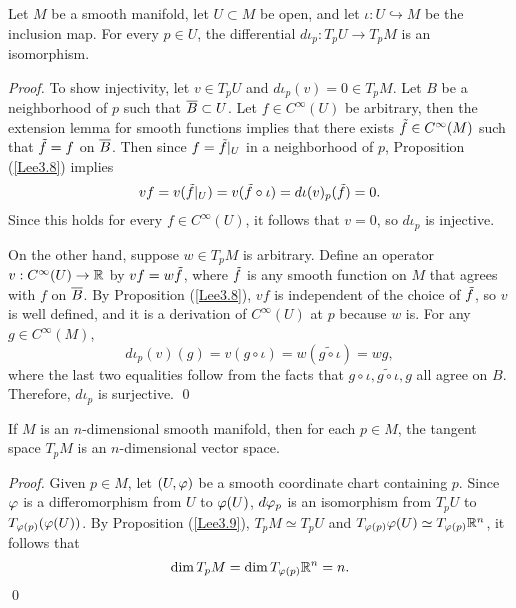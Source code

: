 \begin{proposition}\label{Lee3.9}
    Let $M$ be a smooth manifold, let $U \subset M$ be open, and let $\iota: U \hookrightarrow M$ be the inclusion map. For every $p \in U$, the differential $d\iota_p: T_pU \to T_pM$ is an isomorphism. 
\end{proposition}
\begin{proof}
    To show injectivity, let $v \in T_pU$ and $d\iota_p(v) = 0 \in T_pM$. Let $B$ be a neighborhood of $p$ such that $\overline{B} \subset U$. Let $f \in C^\infty(U)$ be arbitrary, then the extension lemma for smooth functions implies that there exists $\Tilde{f} \in C^\infty(M)$ such that $\Tilde{f} = f$ on $\overline{B}$. Then since $f=\Tilde{f}|_U$ in a neighborhood of $p$, Proposition (\ref{Lee3.8}) implies 
    $$vf=v(\Tilde{f}|_U) = v(\Tilde{f} \circ \iota) = d\iota(v)_p (\Tilde{f}) = 0.$$
    Since this holds for every $f \in C^\infty(U)$, it follows that $v=0$, so $d\iota_p$ is injective. 

    On the other hand, suppose $w \in T_pM$ is arbitrary. Define an operator $v:C^\infty(U) \to \mathbb{R}$ by $vf = w\Tilde{f}$, where $\Tilde{f}$ is any smooth function on $M$ that agrees with $f$ on $\overline{B}$. By Proposition (\ref{Lee3.8}), $vf$ is independent of the choice of $\Tilde{f}$, so $v$ is well defined, and it is a derivation of $C^\infty(U)$ at $p$ because $w$ is. For any $g \in C^\infty(M)$, 
    $$d\iota_p(v)(g) = v(g \circ \iota) = w(\widetilde{g \circ \iota}) = wg, $$
    where the last two equalities follow from the facts that $g \circ \iota, \widetilde{g \circ \iota}, g$ all agree on $B$. Therefore, $d\iota_p$ is surjective. \qed 
\end{proof}
\begin{proposition}
    If $M$ is an $n$-dimensional smooth manifold, then for each $p \in M$, the tangent space $T_pM$ is an $n$-dimensional vector space. 
\end{proposition}
\begin{proof}
    Given $p \in M$, let $(U,\varphi)$ be a smooth coordinate chart containing $p$. Since $\varphi$ is a differomorphism from $U$ to $\varphi(U)$, $d\varphi_p$ is an isomorphism from $T_pU$ to $T_{\varphi(p)}(\varphi(U))$. By Proposition (\ref{Lee3.9}), $T_pM \simeq T_pU$ and $T_{\varphi(p)}\varphi(U) \simeq T_{\varphi(p)}\mathbb{R}^n$, it follows that $$\dim T_p M = \dim T_{\varphi(p)}\mathbb{R}^n = n. $$ \qed 
\end{proof}






